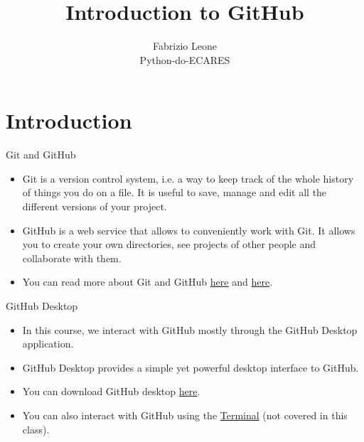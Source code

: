 \documentclass[aspectratio=169]{beamer}
\title{Introduction to GitHub}
\author{Fabrizio Leone \\ Python-do-ECARES}
\begin{document}
\begin{frame}[plain]
    \maketitle
\end{frame}

\section{Introduction}

\begin{frame}{Git and GitHub}

\begin{itemize}\setlength\itemsep{2.5em}
	\item Git is a version control system, i.e. a way to keep track of the whole history of things you do on a file. It is useful to save, manage and edit all the different versions of your project. 
	\item GitHub is a web service that allows to conveniently work with Git. It allows you to create your own directories, see projects of other people and collaborate with them. 
	\item You can read more about Git and GitHub \href{https://medium.com/@abhishekj/an-intro-to-git-and-github-1a0e2c7e3a2f}{here} and \href{https://medium.com/launch-school/understanding-git-and-github-8ac987877a5}{here}.
\end{itemize}

\end{frame}

\begin{frame}{GitHub Desktop}

\begin{itemize}\setlength\itemsep{2em}
		\item In this course, we interact with GitHub mostly through the GitHub Desktop application.
		\item GitHub Desktop provides a simple yet powerful desktop interface to GitHub.
		\item You can download GitHub desktop \href{https://desktop.github.com/}{here}. 
		\item You can also interact with GitHub using the \href{https://github.com/codepath/ios_guides/wiki/Using-Git-with-Terminal}{Terminal} (not covered in this class).
\end{itemize}	

\end{frame}
\end{document}
